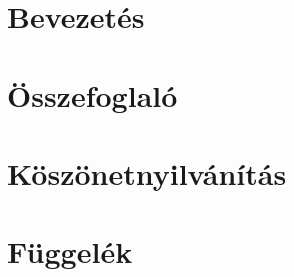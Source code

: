 \documentclass[12pt]{report}
\begin{document}
	
	
	
	
	\tableofcontents
	
	\newpage
	\chapter{Bevezetés}
	
	
	\newpage
	
	
	\newpage
	\chapter{Összefoglaló}
	
	
	\newpage
	\chapter*{Köszönetnyilvánítás}
	
	
	\newpage
	\printbibliography[
	heading=bibnumbered, title={Irodalomjegyzék}]
	
	\newpage
	\chapter{Függelék}
	
	
	
\end{document}
